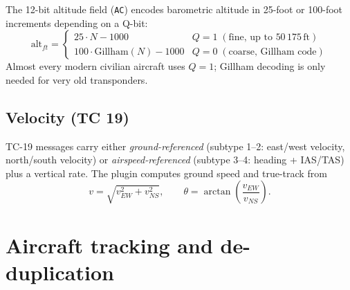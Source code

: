 \documentclass[11pt,a4paper]{article}
\begin{document}
The 12-bit altitude field (\texttt{AC}) encodes barometric altitude in
25-foot or 100-foot increments depending on a Q-bit:
\begin{equation}
\text{alt}_{ft} =
  \begin{cases}
    25 \cdot N - 1000       & Q = 1\;(\text{fine, up to } 50\,175\,\text{ft})\\
    100 \cdot \text{Gillham}(N) - 1000
                            & Q = 0\;(\text{coarse, Gillham code})
  \end{cases}
\end{equation}
Almost every modern civilian aircraft uses $Q=1$; Gillham decoding is
only needed for very old transponders.

\subsection{Velocity (TC 19)}

TC-19 messages carry either \emph{ground-referenced} (subtype 1--2:
east/west velocity, north/south velocity) or \emph{airspeed-referenced}
(subtype 3--4: heading + IAS/TAS) plus a vertical rate.  The plugin
computes ground speed and true-track from
\begin{equation}
v = \sqrt{v_{EW}^{2} + v_{NS}^{2}},
\qquad
\theta = \arctan\!\left(\frac{v_{EW}}{v_{NS}}\right).
\end{equation}

\begin{center}
\end{center}

\section{Aircraft tracking and de-duplication}
\end{document}
